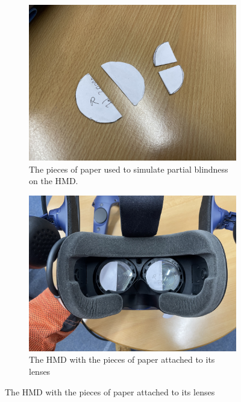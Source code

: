 \documentclass{l4proj}
\begin{document}
\begin{figure}[!h]
    \centering
    \begin{subfigure}[b]{0.4\textwidth}
        \includegraphics[width=\textwidth]{images/Pieces of paper.jpg}
        \caption{The pieces of paper used to simulate partial blindness on the HMD. }
        \label{fig:piecesPaper}
    \end{subfigure}
    \hfill
    \begin{subfigure}[b]{0.4\textwidth}
        \includegraphics[width=\textwidth]{images/HemianopiaSimulator.jpg}    
        \caption{The HMD with the pieces of paper attached to its lenses}
        \label{fig:simulatedHMDsticker}
    \end{subfigure}
    
    

    
\end{figure}
\end{document}
